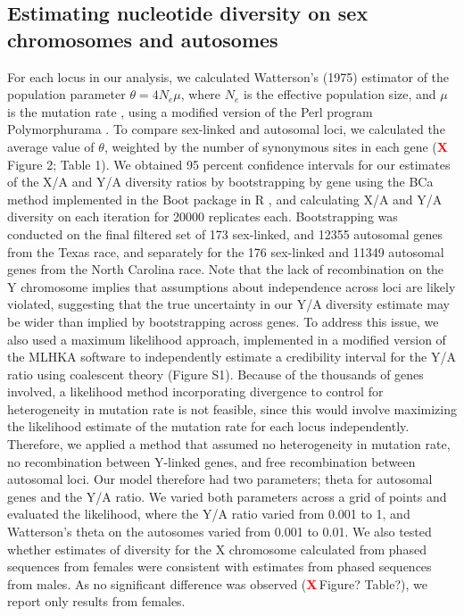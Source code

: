 \documentclass[9pt,twocolumn,twoside]{gsajnl}
\newcommand{\X}{\textcolor{red}{\bf X\,}}
\begin{document}
\subsection*{Estimating nucleotide diversity on sex chromosomes and autosomes}
For each locus in our analysis, we calculated Watterson’s (1975) estimator of the population parameter $\theta=4N_{e}\mu$, where $N_{e}$ is the effective population size, and $\mu$ is the mutation rate \citep{watterson1975}, using a modified version of the Perl program Polymorphurama \citep{bachtrog2006}. To compare sex-linked and autosomal loci, we calculated the average value of $\theta$, weighted by the number of synonymous sites in each gene (\X Figure 2; Table 1). We obtained 95 percent confidence intervals for our estimates of the X/A and Y/A diversity ratios by bootstrapping by gene using the BCa method \citep{efron1994} implemented in the Boot package in R \citep{canty2012boot}, and calculating X/A and Y/A diversity on each iteration for 20000 replicates each. Bootstrapping was conducted on the final filtered set of 173 sex-linked, and 12355 autosomal genes from the Texas race, and separately for the 176 sex-linked and 11349 autosomal genes from the North Carolina race. Note that the lack of recombination on the Y chromosome implies that assumptions about independence across loci are likely violated, suggesting that the true uncertainty in our Y/A diversity estimate may be wider than implied by bootstrapping across genes. To address this issue, we also used a maximum likelihood approach, implemented in a modified version of the MLHKA software \citep{wright2004hka} to independently estimate a credibility interval for the Y/A ratio using coalescent theory (Figure S1). Because of the thousands of genes involved, a likelihood method incorporating divergence to control for heterogeneity in mutation rate is not feasible, since this would involve maximizing the likelihood estimate of the mutation rate for each locus independently.  Therefore, we applied a method that assumed no heterogeneity in mutation rate, no recombination between Y-linked genes, and free recombination between autosomal loci. Our model therefore had two parameters; theta for autosomal genes and the Y/A ratio. We varied both parameters across a grid of points and evaluated the likelihood, where the Y/A ratio varied from 0.001 to 1, and Watterson's theta on the autosomes varied from 0.001 to 0.01. We also tested whether estimates of diversity for the X chromosome calculated from phased sequences from females were consistent with estimates from phased sequences from males. As no significant difference was observed (\X Figure? Table?), we report only results from females.
\end{document}
